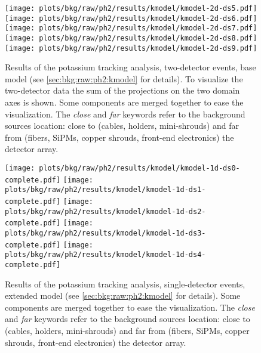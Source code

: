 \begin{figure}
  \centering
  \texttt{[image: plots/bkg/raw/ph2/results/kmodel/kmodel-2d-ds5.pdf]}
  \texttt{[image: plots/bkg/raw/ph2/results/kmodel/kmodel-2d-ds6.pdf]}\vspace{10pt}
  \texttt{[image: plots/bkg/raw/ph2/results/kmodel/kmodel-2d-ds7.pdf]}
  \texttt{[image: plots/bkg/raw/ph2/results/kmodel/kmodel-2d-ds8.pdf]}\vspace{10pt}
  \texttt{[image: plots/bkg/raw/ph2/results/kmodel/kmodel-2d-ds9.pdf]}
  \begin{minipage}[b][5.3cm][c]{0.45\textwidth}
    \hspace{15pt}%
    \parbox{0.91\textwidth}{%
      \caption{%
        Results of the potassium tracking analysis, two-detector events, base model (see
        \cref{sec:bkg:raw:ph2:kmodel} for details). To visualize the two-detector data the
        sum of the projections on the two domain axes is shown. Some components are merged
        together to ease the visualization. The \emph{close} and \emph{far} keywords refer
        to the background sources location: close to (cables, holders, mini-shrouds) and far
        from (fibers, SiPMs, copper shrouds, front-end electronics) the detector array.
      }\label{fig:bkg:raw:ph2:kmodel:base:results:M2}
    }
  \end{minipage}
\end{figure}

\begin{figure}
  \centering
  \texttt{[image: plots/bkg/raw/ph2/results/kmodel/kmodel-1d-ds0-complete.pdf]}
  \texttt{[image: plots/bkg/raw/ph2/results/kmodel/kmodel-1d-ds1-complete.pdf]}\vspace{10pt}
  \texttt{[image: plots/bkg/raw/ph2/results/kmodel/kmodel-1d-ds2-complete.pdf]}
  \texttt{[image: plots/bkg/raw/ph2/results/kmodel/kmodel-1d-ds3-complete.pdf]}\vspace{10pt}
  \texttt{[image: plots/bkg/raw/ph2/results/kmodel/kmodel-1d-ds4-complete.pdf]}
  \begin{minipage}[b][5.3cm][c]{0.45\textwidth}
    \hspace{15pt}%
    \parbox{0.91\textwidth}{%
      \caption{%
        Results of the potassium tracking analysis, single-detector events, extended model (see
        \cref{sec:bkg:raw:ph2:kmodel} for details). Some components are merged together to
        ease the visualization. The \emph{close} and \emph{far} keywords refer to the
        background sources location: close to (cables, holders, mini-shrouds) and far from
        (fibers, SiPMs, copper shrouds, front-end electronics) the detector array.
      }\label{fig:bkg:raw:ph2:kmodel:extended:results:M1}
    }
  \end{minipage}
\end{figure}

